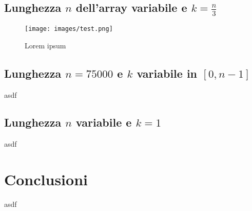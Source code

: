 \documentclass{article}
\begin{document}
	
	\subsection{Lunghezza $n$ dell'array variabile e $k=\frac{n}{3}$}
	
	\begin{figure}[h!]
  		\texttt{[image: images/test.png]}
  		\caption{Lorem ipsum}
  		\label{fig:graph1}
	\end{figure}	
	
	
	\subsection{Lunghezza $n=75000$ e $k$ variabile in $[0,n-1]$}
	asdf
	\newpage
	
	
	\subsection{Lunghezza $n$ variabile e $k=1$}
	asdf
	\newpage


	\section{Conclusioni}
	asdf
\end{document}
